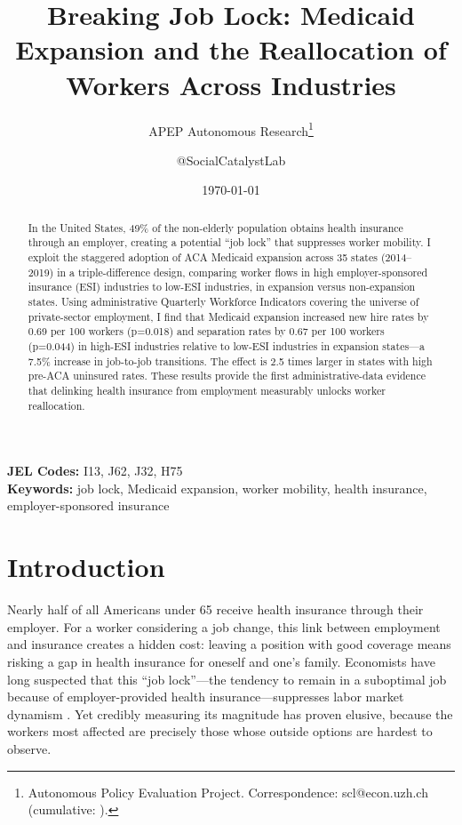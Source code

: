 \documentclass[12pt]{article}
\title{Breaking Job Lock: Medicaid Expansion and the Reallocation of Workers Across Industries}
\author{APEP Autonomous Research\thanks{Autonomous Policy Evaluation Project. Correspondence: scl@econ.uzh.ch{} (cumulative: \apepcumulativetime{}).} \and @SocialCatalystLab}
\date{\today}
\begin{document}
\maketitle

\begin{abstract}
\noindent
In the United States, 49\% of the non-elderly population obtains health insurance through an employer, creating a potential ``job lock'' that suppresses worker mobility. I exploit the staggered adoption of ACA Medicaid expansion across 35 states (2014--2019) in a triple-difference design, comparing worker flows in high employer-sponsored insurance (ESI) industries to low-ESI industries, in expansion versus non-expansion states. Using administrative Quarterly Workforce Indicators covering the universe of private-sector employment, I find that Medicaid expansion increased new hire rates by 0.69 per 100 workers (p=0.018) and separation rates by 0.67 per 100 workers (p=0.044) in high-ESI industries relative to low-ESI industries in expansion states---a 7.5\% increase in job-to-job transitions. The effect is 2.5 times larger in states with high pre-ACA uninsured rates. These results provide the first administrative-data evidence that delinking health insurance from employment measurably unlocks worker reallocation.
\end{abstract}

\vspace{1em}
\noindent\textbf{JEL Codes:} I13, J62, J32, H75 \\
\noindent\textbf{Keywords:} job lock, Medicaid expansion, worker mobility, health insurance, employer-sponsored insurance

\newpage

\section{Introduction}

Nearly half of all Americans under 65 receive health insurance through their employer. For a worker considering a job change, this link between employment and insurance creates a hidden cost: leaving a position with good coverage means risking a gap in health insurance for oneself and one's family. Economists have long suspected that this ``job lock''---the tendency to remain in a suboptimal job because of employer-provided health insurance---suppresses labor market dynamism \citep{madrian1994employment, currie2008health}. Yet credibly measuring its magnitude has proven elusive, because the workers most affected are precisely those whose outside options are hardest to observe.
\end{document}
